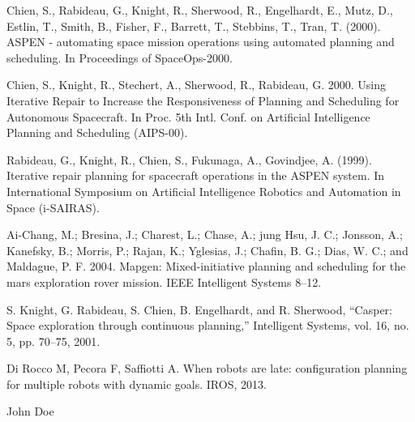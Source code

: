\documentclass[conference]{IEEEtran}
\begin{document}
\begin{thebibliography}{1}

Chien, S., Rabideau, G., Knight, R., Sherwood, R., Engelhardt, E., Mutz, D., Estlin, T., Smith, B., Fisher, F., Barrett, T., Stebbins, T., Tran, T. (2000). ASPEN - automating space mission operations using automated planning and scheduling. In Proceedings of SpaceOps-2000.

Chien, S., Knight, R., Stechert, A., Sherwood, R., Rabideau, G. 2000. Using Iterative Repair to Increase the Responsiveness of Planning and Scheduling for Autonomous Spacecraft. In Proc. 5th Intl. Conf. on Artificial Intelligence Planning and Scheduling (AIPS-00).

Rabideau, G., Knight, R., Chien, S., Fukunaga, A., Govindjee, A. (1999). Iterative repair planning for spacecraft operations in the ASPEN system. In International Symposium on Artificial Intelligence Robotics and Automation in Space (i-SAIRAS).

Ai-Chang, M.; Bresina, J.; Charest, L.; Chase, A.; jung Hsu, J. C.; Jonsson, A.; Kanefsky, B.; Morris, P.; Rajan, K.; Yglesias, J.; Chafin, B. G.; Dias, W. C.; and Maldague, P. F. 2004. Mapgen: Mixed-initiative planning and scheduling for the mars exploration rover mission. IEEE Intelligent Systems 8–12.

S. Knight, G. Rabideau, S. Chien, B. Engelhardt, and R. Sherwood,
“Casper: Space exploration through continuous planning,” Intelligent
Systems, vol. 16, no. 5, pp. 70–75, 2001.

Di Rocco M, Pecora F, Saffiotti A. When robots are late: configuration planning for multiple robots with dynamic goals. IROS, 2013.


\end{thebibliography}


\begin{IEEEbiography}{John Doe}
\end{IEEEbiography}
\end{document}
